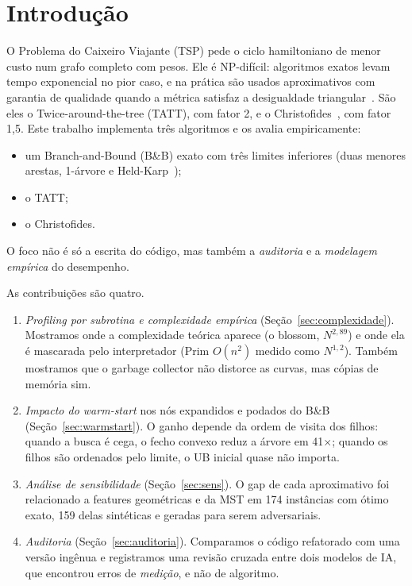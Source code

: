 \section{Introdução}

O Problema do Caixeiro Viajante (TSP) pede o ciclo hamiltoniano de menor
custo num grafo completo com pesos. Ele é NP-difícil: algoritmos exatos
levam tempo exponencial no pior caso, e na prática são usados
aproximativos com garantia de qualidade quando a métrica satisfaz a
desigualdade triangular~\cite{applegate2006}. São eles o
Twice-around-the-tree (TATT), com fator 2, e o
Christofides~\cite{christofides1976}, com fator 1,5. Este trabalho
implementa três algoritmos e os avalia empiricamente:
\begin{itemize}
  \item um Branch-and-Bound (B\&B) exato com três limites inferiores (duas
    menores arestas, 1-árvore e Held-Karp~\cite{heldkarp1970,heldkarp1971});
  \item o TATT;
  \item o Christofides.
\end{itemize}
O foco não é só a escrita do código, mas também a \emph{auditoria} e a
\emph{modelagem empírica} do desempenho.

As contribuições são quatro.
\begin{enumerate}
  \item \emph{Profiling por subrotina e complexidade empírica}
    (Seção~\ref{sec:complexidade}). Mostramos onde a complexidade teórica
    aparece (o blossom, $N^{2{,}89}$) e onde ela é mascarada pelo
    interpretador (Prim $O(n^2)$ medido como $N^{1{,}2}$). Também mostramos
    que o garbage collector não distorce as curvas, mas cópias de memória
    sim.
  \item \emph{Impacto do warm-start} nos nós expandidos e podados do B\&B
    (Seção~\ref{sec:warmstart}). O ganho depende da ordem de visita dos
    filhos: quando a busca é cega, o fecho convexo reduz a árvore em
    41$\times$; quando os filhos são ordenados pelo limite, o UB inicial
    quase não importa.
  \item \emph{Análise de sensibilidade} (Seção~\ref{sec:sens}). O gap de
    cada aproximativo foi relacionado a features geométricas e da MST em
    174 instâncias com ótimo exato, 159 delas sintéticas e geradas para
    serem adversariais.
  \item \emph{Auditoria} (Seção~\ref{sec:auditoria}). Comparamos o código
    refatorado com uma versão ingênua e registramos uma revisão cruzada
    entre dois modelos de IA, que encontrou erros
    de \emph{medição}, e não de algoritmo.
\end{enumerate}
